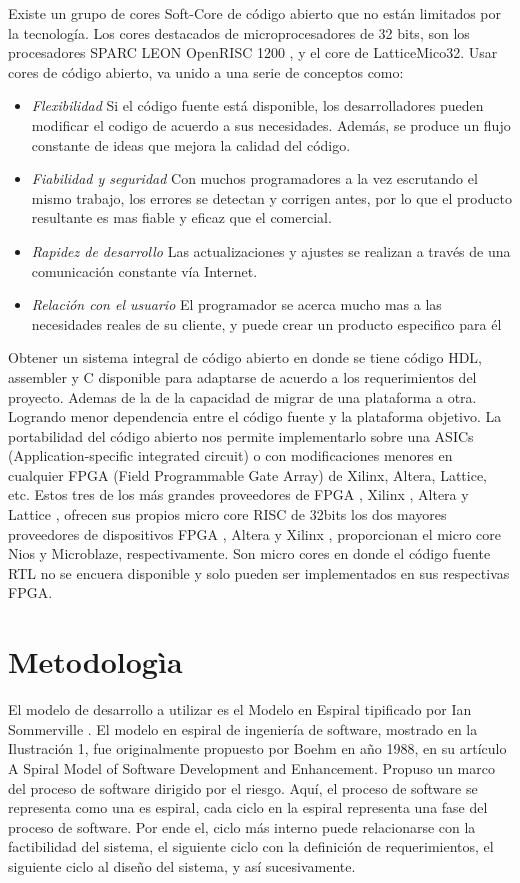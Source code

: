 Existe un grupo de cores Soft-Core de código abierto que no están limitados por la tecnología. Los cores destacados de microprocesadores de 32 bits,
son los procesadores SPARC LEON OpenRISC 1200 , y el core de LatticeMico32. Usar cores de  código abierto,  va unido a una serie de conceptos como:
 \begin {itemize}
\item
\textit{Flexibilidad}  Si el código fuente está disponible, los desarrolladores pueden modificar el codigo de acuerdo a sus necesidades. Además, se
produce un flujo constante de ideas que mejora la calidad del código.
\item 
\textit{Fiabilidad y seguridad}  Con muchos programadores a la vez escrutando el mismo trabajo, los errores se detectan y corrigen antes, por lo que
el producto resultante es mas fiable y eficaz que el comercial.
\item 
\textit{Rapidez de desarrollo}  Las actualizaciones y ajustes se realizan a través de una comunicación constante vía Internet.
\item 
\textit{Relación con el usuario} El programador se acerca mucho mas a las necesidades reales de su cliente, y puede crear un producto especifico para
él
 \end {itemize}
 
Obtener un sistema integral de código abierto en donde se tiene código HDL, assembler y C disponible para adaptarse de acuerdo a los requerimientos del proyecto. Ademas de la de la capacidad de migrar de una plataforma a otra. Logrando menor dependencia entre el código fuente y la plataforma objetivo. 
La portabilidad del código abierto nos permite implementarlo sobre una ASICs (Application-specific integrated circuit) o con modificaciones menores en cualquier FPGA (Field Programmable Gate Array) de Xilinx, Altera, Lattice, etc. 
Estos tres de los más grandes proveedores de FPGA , Xilinx , Altera y Lattice , ofrecen sus propios micro core RISC de 32bits los dos mayores proveedores de dispositivos FPGA , Altera y Xilinx , proporcionan el micro core Nios y Microblaze, respectivamente. Son micro cores  en donde el código fuente RTL no se encuera disponible y solo pueden ser implementados en sus respectivas FPGA.

\section{Metodologìa}

El modelo de desarrollo a utilizar es el Modelo en Espiral tipificado por Ian Sommerville\cite{Etiqueta00} . El modelo en espiral de ingeniería de software, mostrado en la Ilustración 1, fue originalmente propuesto por Boehm en año 1988, en su artículo A Spiral Model of Software Development and Enhancement. Propuso un marco del proceso de software dirigido por el riesgo. Aquí, el proceso de software se representa como una es espiral, cada ciclo en la espiral representa una fase del proceso de software. Por ende el, ciclo más interno puede relacionarse con la factibilidad del sistema, el siguiente ciclo con la definición de requerimientos, el siguiente ciclo al diseño del sistema, y así sucesivamente.


